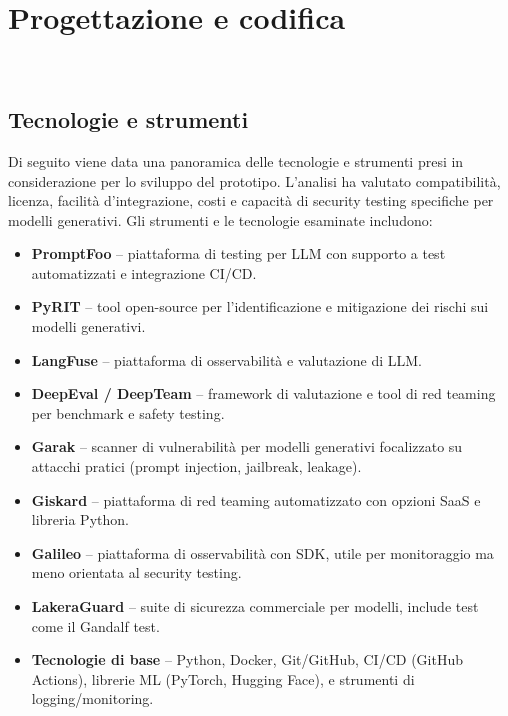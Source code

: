 \chapter{Progettazione e codifica}
\label{cap:progettazione-codifica}

\\

\section{Tecnologie e strumenti}
\label{sec:tecnologie-strumenti}

Di seguito viene data una panoramica delle tecnologie e strumenti presi in considerazione per lo sviluppo del prototipo. L'analisi ha valutato compatibilità, licenza, facilità d'integrazione, costi e capacità di security testing specifiche per modelli generativi. Gli strumenti e le tecnologie esaminate includono:

\begin{itemize}
    \item \textbf{PromptFoo} -- piattaforma di testing per LLM con supporto a test automatizzati e integrazione CI/CD.
    \item \textbf{PyRIT} -- tool open-source per l'identificazione e mitigazione dei rischi sui modelli generativi.
    \item \textbf{LangFuse} -- piattaforma di osservabilità e valutazione di LLM.
    \item \textbf{DeepEval / DeepTeam} -- framework di valutazione e tool di red teaming per benchmark e safety testing.
    \item \textbf{Garak} -- scanner di vulnerabilità per modelli generativi focalizzato su attacchi pratici (prompt injection, jailbreak, leakage).
    \item \textbf{Giskard} -- piattaforma di red teaming automatizzato con opzioni SaaS e libreria Python.
    \item \textbf{Galileo} -- piattaforma di osservabilità con SDK, utile per monitoraggio ma meno orientata al security testing.
    \item \textbf{LakeraGuard} -- suite di sicurezza commerciale per modelli, include test come il Gandalf test.
    \item \textbf{Tecnologie di base} -- Python, Docker, Git/GitHub, CI/CD (GitHub Actions), librerie ML (PyTorch, Hugging Face), e strumenti di logging/monitoring.
\end{itemize}

